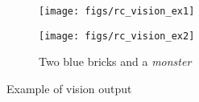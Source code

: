   	\begin{figure}[H]
        \centering
        \begin{subfigure}{0.45\textwidth}
            \texttt{[image: figs/rc\_vision\_ex1]}
            \caption{}
            \label{fig:rc_vision_ex1}
        \end{subfigure}
        \hspace{10pt}
        \begin{subfigure}{0.45\textwidth}
            \texttt{[image: figs/rc\_vision\_ex2]}
            \caption{Two blue bricks and a \textit{monster}}
            \label{fig:rc_vision_ex2}
    \end{subfigure}
    \caption{Example of vision output}
    \end{figure}